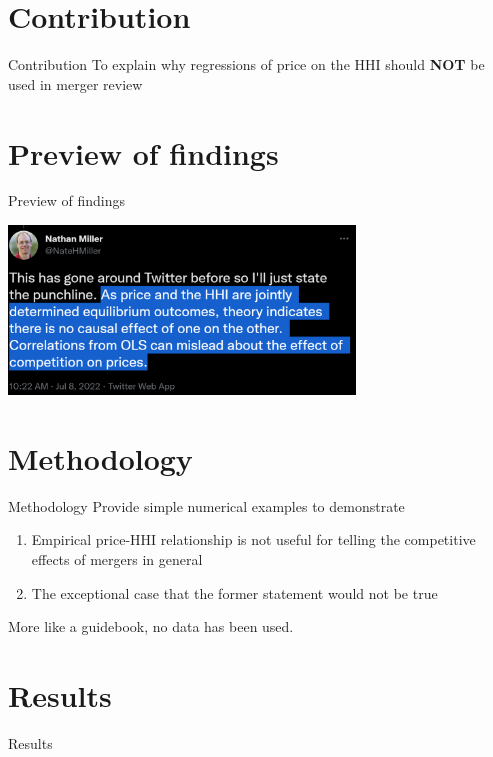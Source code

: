 \documentclass{beamer}
\begin{document}
\section{Contribution}
\begin{frame}{Contribution}
To explain why regressions of price on the HHI should \textbf{NOT} be used in merger review
\end{frame}

\section{Preview of findings}
\begin{frame}{Preview of findings}
\begin{center}
\includegraphics[height=4.5cm]{nathanmillertwit}
\end{center}
\end{frame}

\section{Methodology}
\begin{frame}{Methodology}
Provide simple numerical examples to demonstrate
\begin{enumerate}
\item Empirical price-HHI relationship is not useful for telling the competitive effects of mergers in general
\item The exceptional case that the former statement would not be true
\end{enumerate}
More like a guidebook, no data has been used.
\end{frame}

\section{Results}
\begin{frame}
\begin{center}
Results
\end{center}
\end{frame}
\end{document}
